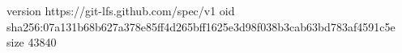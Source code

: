 version https://git-lfs.github.com/spec/v1
oid sha256:07a131b68b627a378e85ff4d265bff1625e3d98f038b3cab63bd783af4591c5e
size 43840
